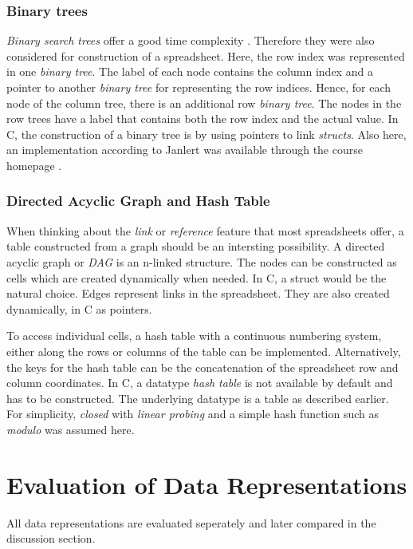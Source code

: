 \documentclass[a4paper,11pt,twoside]{article}
\begin{document}
\subsubsection{Binary trees}
\textit{Binary search trees} offer a good time complexity
\cite[pp. 286-291]{janlert2000}. Therefore they were also considered
for construction of a spreadsheet. Here, the row index was represented
in one \textit{binary tree}. The label of each node contains the
column index and a pointer to another \textit{binary tree} for
representing the row indices. Hence, for each node of the column tree,
there is an additional row \textit{binary tree}. The nodes in the row
trees have a label that contains both the row index and the actual value. 
In C, the construction of a binary tree is by using pointers to link
\textit{structs}. Also here, an implementation according to Janlert
\cite{janlert2000} was available through the course homepage
\cite{datatypes}. 

\subsubsection{Directed Acyclic Graph and Hash Table}
When thinking about the \emph{link} or \emph{reference} feature that most
spreadsheets offer, a table constructed from a graph
should be an intersting possibility.  A directed acyclic graph or
\textit{DAG} is an n-linked structure. The nodes can be
constructed as cells which are created dynamically when needed. In C, a
struct would be the natural choice. Edges represent links in the
spreadsheet. They are also created dynamically, in C as pointers. 

To access individual cells, a hash table with a continuous numbering
system, either along the rows or columns of the table can be
implemented. Alternatively, the keys for the hash table can be the
concatenation of the spreadsheet row and column coordinates. In C, a
datatype \textit{hash table} is not available by default and has to be
constructed. The underlying datatype is a table as described
earlier. For simplicity, \emph{closed} with \emph{linear
 probing} and a simple hash function such as \textit{modulo} was
assumed here\cite[p. 277]{janlert2000}. 


\section{Evaluation of Data Representations}
All data representations are evaluated seperately and later compared
in the discussion section.
\end{document}
